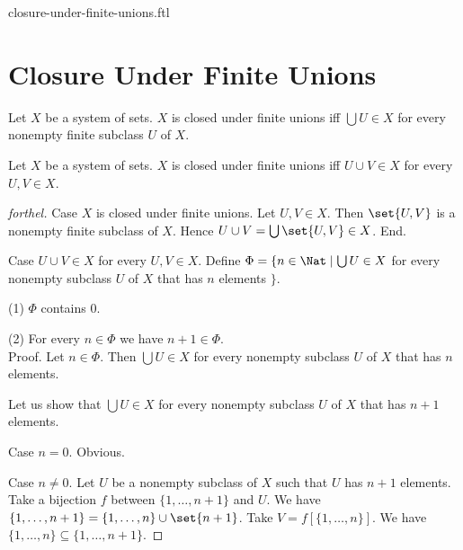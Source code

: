 \documentclass{naproche-library}
\begin{document}
\begin{smodule}{closure-under-finite-unions.ftl}

  \section*{Closure Under Finite Unions}

  \begin{definition}[forthel,id=FOUNDATIONS_14_7040118193913856]
    Let $X$ be a system of sets.
    $X$ is closed under finite unions iff $\bigcup U \in X$ for every nonempty finite subclass $U$ of $X$.
  \end{definition}

  \begin{proposition}[forthel,id=FOUNDATIONS_17_4164024962908160]
    Let $X$ be a system of sets.
    $X$ is closed under finite unions iff $U \cup V \in X$ for every $U, V \in X$.
  \end{proposition}
  \begin{proof}[forthel]
    Case $X$ is closed under finite unions.
      Let $U, V \in X$.
      Then $\set{U, V}$ is a nonempty finite subclass of $X$.
      Hence $U \cup V = \bigcup \set{U, V} \in X$.
    End.

    Case $U \cup V \in X$ for every $U, V \in X$.
      Define $\Phi = \{ n \in \Nat \mid \bigcup U \in X$ for every nonempty subclass $U$ of $X$ that has $n$ elements $\}$.

      (1) $\Phi$ contains $0$.

      (2) For every $n \in \Phi$ we have $n + 1 \in \Phi$. \\
      Proof.
        Let $n \in \Phi$.
        Then $\bigcup U \in X$ for every nonempty subclass $U$ of $X$ that has $n$ elements.

        Let us show that $\bigcup U \in X$ for every nonempty subclass $U$ of $X$ that has $n + 1$ elements.

          Case $n = 0$. Obvious.

          Case $n \neq 0$.
            Let $U$ be a nonempty subclass of $X$ such that $U$ has $n + 1$ elements.
            Take a bijection $f$ between $\{1, \dots, n + 1 \}$ and $U$.
            We have $\{ 1, \dots, n + 1 \} = \{ 1, \dots, n \} \cup \set{n + 1}$.
            Take $V = f[\{ 1, \dots, n \}]$.
            We have $\{ 1, \dots, n \} \subseteq \{ 1, \dots, n + 1 \}$.


\end{proof}
\end{smodule}
\end{document}
